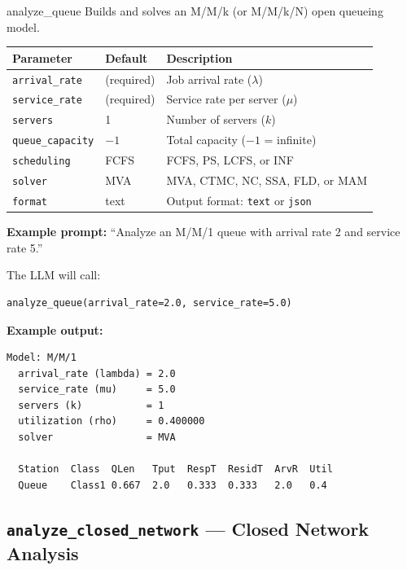 \documentclass[11pt]{article}
\begin{document}
\begin{toolbox}{analyze\_queue}
Builds and solves an M/M/k (or M/M/k/N) open queueing model.
\vspace{4pt}

\begin{tabularx}{\textwidth}{llX}
\toprule
\textbf{Parameter} & \textbf{Default} & \textbf{Description} \\
\midrule
\texttt{arrival\_rate} & (required) & Job arrival rate ($\lambda$) \\
\texttt{service\_rate} & (required) & Service rate per server ($\mu$) \\
\texttt{servers} & 1 & Number of servers ($k$) \\
\texttt{queue\_capacity} & $-1$ & Total capacity ($-1$ = infinite) \\
\texttt{scheduling} & FCFS & FCFS, PS, LCFS, or INF \\
\texttt{solver} & MVA & MVA, CTMC, NC, SSA, FLD, or MAM \\
\texttt{format} & text & Output format: \texttt{text} or \texttt{json} \\
\bottomrule
\end{tabularx}
\end{toolbox}

\noindent\textbf{Example prompt:} ``Analyze an M/M/1 queue with arrival rate 2 and service rate 5.''

The LLM will call:
\begin{lstlisting}[style=pythonstyle]
analyze_queue(arrival_rate=2.0, service_rate=5.0)
\end{lstlisting}

\noindent\textbf{Example output:}
\begin{lstlisting}[style=shellstyle]
Model: M/M/1
  arrival_rate (lambda) = 2.0
  service_rate (mu)     = 5.0
  servers (k)           = 1
  utilization (rho)     = 0.400000
  solver                = MVA

  Station  Class  QLen   Tput  RespT  ResidT  ArvR  Util
  Queue    Class1 0.667  2.0   0.333  0.333   2.0   0.4
\end{lstlisting}

\subsection{\texttt{analyze\_closed\_network} --- Closed Network Analysis}
\end{document}
